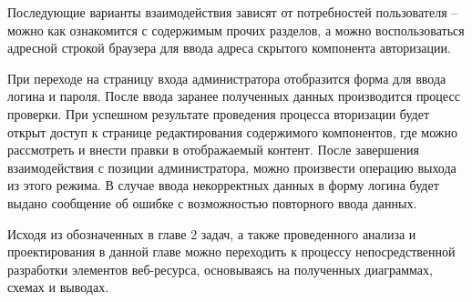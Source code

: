 Последующие варианты взаимодействия зависят от потребностей пользователя -- можно как ознакомится с содержимым прочих разделов, а можно воспользоваться адресной строкой браузера для ввода адреса скрытого компонента авторизации.

При переходе на страницу входа администратора отобразится форма для ввода логина и пароля.
После ввода заранее полученных данных производится процесс проверки.
При успешном результате проведения процесса вторизации будет открыт доступ к странице редактирования содержимого компонентов, где можно рассмотреть и внести правки в отображаемый контент.
После завершения взаимодействия с позиции администратора, можно произвести операцию выхода из этого режима.
В случае ввода некорректных данных в форму логина будет выдано сообщение об ошибке с возможностью повторного ввода данных.

Исходя из обозначенных в главе 2 задач, а также проведенного анализа и проектирования в данной главе можно переходить к процессу непосредственной разработки элементов веб-ресурса, основываясь на полученных диаграммах, схемах и выводах.

\clearpage
